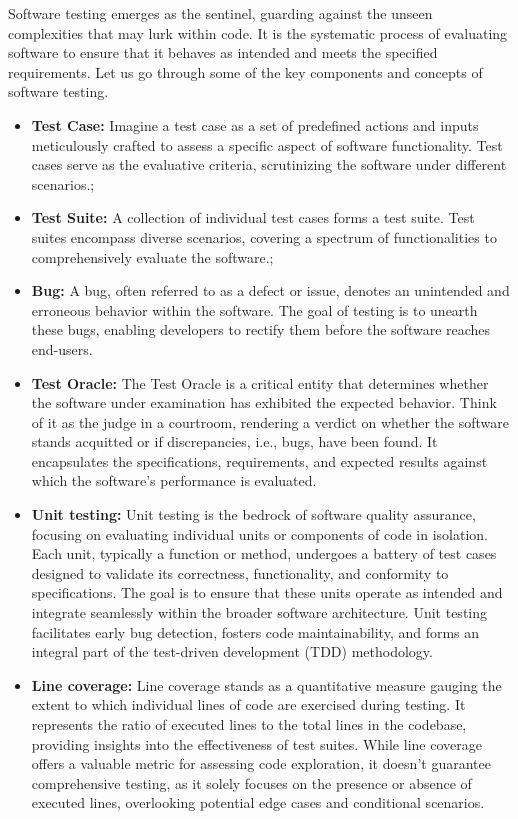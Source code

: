 Software testing emerges as the sentinel, guarding against the unseen complexities that may lurk within code. It is the systematic process of evaluating software to ensure that it behaves as intended and meets the specified requirements. Let us go through some of the key components and concepts of software testing.

\begin{itemize}
  \item \textbf{Test Case:} Imagine a test case as a set of predefined actions and inputs meticulously crafted to assess a specific aspect of software functionality. Test cases serve as the evaluative criteria, scrutinizing the software under different scenarios.;
  \item \textbf{Test Suite:} A collection of individual test cases forms a test suite. Test suites encompass diverse scenarios, covering a spectrum of functionalities to comprehensively evaluate the software.;
  \item \textbf{Bug:} A bug, often referred to as a defect or issue, denotes an unintended and erroneous behavior within the software. The goal of testing is to unearth these bugs, enabling developers to rectify them before the software reaches end-users.
  \item \textbf{Test Oracle:} The Test Oracle is a critical entity that determines whether the software under examination 
  has exhibited the expected behavior. Think of it as the judge in a courtroom, rendering a verdict on whether the software stands acquitted or if discrepancies, i.e., bugs, have been found. It encapsulates the specifications, requirements, and expected results against which the software's performance is evaluated.
  \item \textbf{Unit testing:} Unit testing is the bedrock of software quality assurance, focusing on evaluating individual units or components of code in isolation. Each unit, typically a function or method, undergoes a battery of test cases designed to validate its correctness, functionality, and conformity to specifications. The goal is to ensure that these units operate as intended and integrate seamlessly within the broader software architecture. Unit testing facilitates early bug detection, fosters code maintainability, and forms an integral part of the test-driven development (TDD) methodology.
  \item \textbf{Line coverage:} Line coverage stands as a quantitative measure gauging the extent to which individual lines of code are exercised during testing. It represents the ratio of executed lines to the total lines in the codebase, providing insights into the effectiveness of test suites. While line coverage offers a valuable metric for assessing code exploration, it doesn't guarantee comprehensive testing, as it solely focuses on the presence or absence of executed lines, overlooking potential edge cases and conditional scenarios.

\end{itemize}
